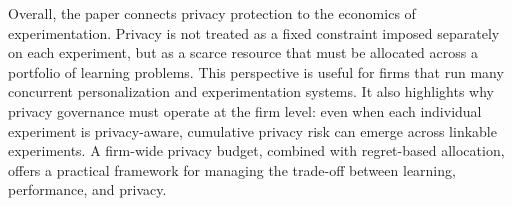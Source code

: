 \documentclass[mksc,nonblindrev]{informs3}
\begin{document}
Overall, the paper connects privacy protection to the economics of experimentation. Privacy is not treated as a fixed constraint imposed separately on each experiment, but as a scarce resource that must be allocated across a portfolio of learning problems. This perspective is useful for firms that run many concurrent personalization and experimentation systems. It also highlights why privacy governance must operate at the firm level: even when each individual experiment is privacy-aware, cumulative privacy risk can emerge across linkable experiments. A firm-wide privacy budget, combined with regret-based allocation, offers a practical framework for managing the trade-off between learning, performance, and privacy.


\end{document}

